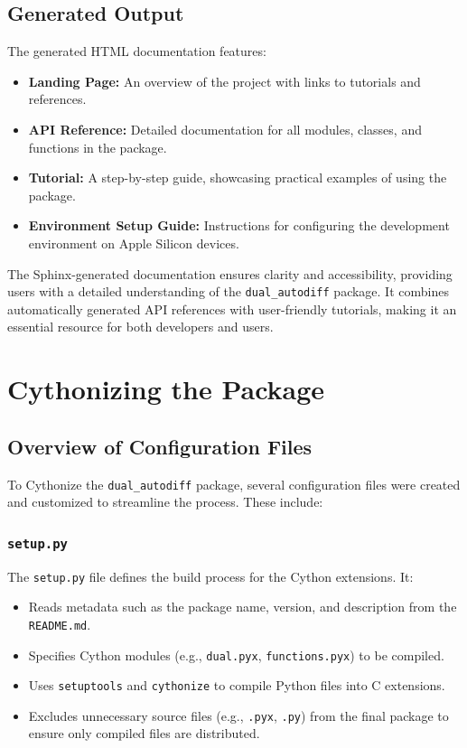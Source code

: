 \documentclass[a4paper,12pt]{article}
\begin{document}
\subsection{Generated Output}
The generated HTML documentation features:
\begin{itemize}
    \item \textbf{Landing Page:} An overview of the project with links to tutorials and references.
    \item \textbf{API Reference:} Detailed documentation for all modules, classes, and functions in the package.
    \item \textbf{Tutorial:} A step-by-step guide, showcasing practical examples of using the package.
    \item \textbf{Environment Setup Guide:} Instructions for configuring the development environment on Apple Silicon devices.
\end{itemize}

The Sphinx-generated documentation ensures clarity and accessibility, providing users with a detailed understanding of the \texttt{dual\_autodiff} package. It combines automatically generated API references with user-friendly tutorials, making it an essential resource for both developers and users.

\section{Cythonizing the Package}

\subsection{Overview of Configuration Files}
To Cythonize the \texttt{dual\_autodiff} package, several configuration files were created and customized to streamline the process. These include:

\subsubsection{\texttt{setup.py}}
The \texttt{setup.py} file defines the build process for the Cython extensions. It:
\begin{itemize}
    \item Reads metadata such as the package name, version, and description from the \texttt{README.md}.
    \item Specifies Cython modules (e.g., \texttt{dual.pyx}, \texttt{functions.pyx}) to be compiled.
    \item Uses \texttt{setuptools} and \texttt{cythonize} to compile Python files into C extensions.
    \item Excludes unnecessary source files (e.g., \texttt{.pyx}, \texttt{.py}) from the final package to ensure only compiled files are distributed.
\end{itemize}
\end{document}
